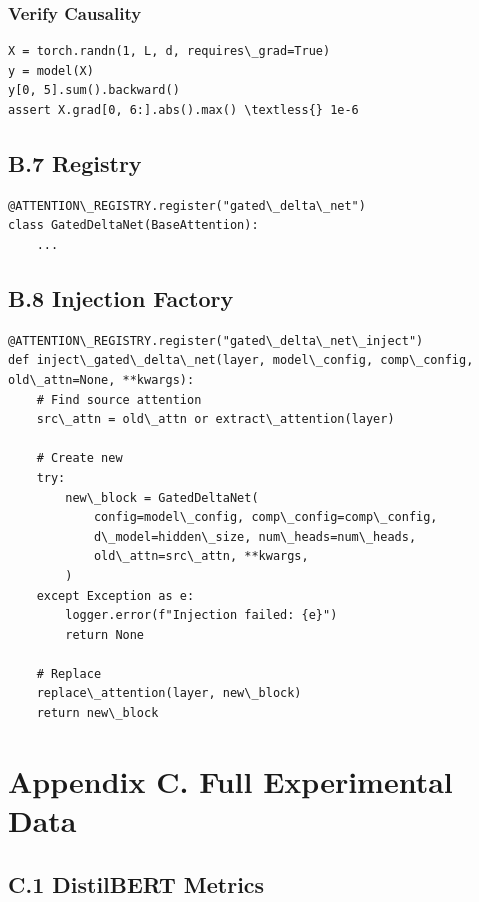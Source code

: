 \subsubsection{Verify Causality}

\begin{lstlisting}
X = torch.randn(1, L, d, requires\_grad=True)
y = model(X)
y[0, 5].sum().backward()
assert X.grad[0, 6:].abs().max() \textless{} 1e-6
\end{lstlisting}

\subsection{B.7 Registry}

\begin{lstlisting}
@ATTENTION\_REGISTRY.register("gated\_delta\_net")
class GatedDeltaNet(BaseAttention):
    ...
\end{lstlisting}

\subsection{B.8 Injection Factory}

\begin{lstlisting}
@ATTENTION\_REGISTRY.register("gated\_delta\_net\_inject")
def inject\_gated\_delta\_net(layer, model\_config, comp\_config, old\_attn=None, **kwargs):
    # Find source attention
    src\_attn = old\_attn or extract\_attention(layer)
    
    # Create new
    try:
        new\_block = GatedDeltaNet(
            config=model\_config, comp\_config=comp\_config,
            d\_model=hidden\_size, num\_heads=num\_heads,
            old\_attn=src\_attn, **kwargs,
        )
    except Exception as e:
        logger.error(f"Injection failed: {e}")
        return None
    
    # Replace
    replace\_attention(layer, new\_block)
    return new\_block
\end{lstlisting}




\section{Appendix C. Full Experimental Data}

\subsection{C.1 DistilBERT Metrics}

